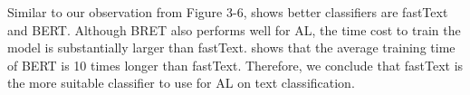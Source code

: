 Similar to our observation from Figure 3-6,  
shows better classifiers are fastText and BERT. Although BRET also 
performs well for AL, the time cost to train the model is substantially
larger than fastText.  shows that 
the average training time of BERT is 10 times longer than fastText. 
Therefore, we conclude that fastText is the more suitable classifier to use 
for AL on text classification.


